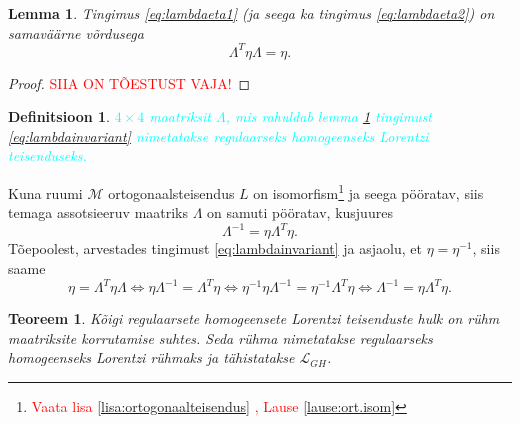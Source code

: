 \documentclass[a4paper,12pt]{article}
\newtheorem{teoreem}{Teoreem}[section]
\newtheorem{definitsioon}{Definitsioon}[section]
\newtheorem{lemma}{Lemma}[section]
\numberwithin{equation}{section}
\begin{document}
\begin{lemma} \label{lemma:lambdainvariant}
Tingimus \ref{eq:lambdaeta1} (ja seega ka tingimus \ref{eq:lambdaeta2}) on samaväärne võrdusega
\begin{equation} \label{eq:lambdainvariant}
\Lambda^T \eta \Lambda = \eta.
\end{equation}
\end{lemma}
\begin{proof}
\textcolor{red}
{SIIA ON TÕESTUST VAJA!}
\end{proof}
\begin{definitsioon}
\textcolor{cyan}{
$4 \times 4$ maatriksit $\Lambda$, mis rahuldab lemma \ref{lemma:lambdainvariant} tingimust \ref{eq:lambdainvariant} nimetatakse \emph{regulaarseks homogeenseks Lorentzi teisenduseks}.
}
\end{definitsioon}
Kuna ruumi $\mathcal{M}$ ortogonaalsteisendus $L$ on isomorfism\footnote{\textcolor{red}{Vaata lisa \ref{lisa:ortogonaalteisendus} , Lause \ref{lause:ort.isom}}} 
ja seega pööratav, siis temaga assotsieeruv maatriks $\Lambda$ on samuti pööratav, kusjuures
\begin{equation} \label{eq:lambda-1lambda-trans}
\Lambda^{-1} = \eta \Lambda^T \eta.
\end{equation}
Tõepoolest, arvestades tingimust \ref{eq:lambdainvariant} ja asjaolu, et $\eta = \eta^{-1}$, siis saame
\begin{equation*}
\eta = \Lambda^T \eta \Lambda \iff \eta \Lambda^{-1} = \Lambda^T \eta \iff \eta^{-1} \eta \Lambda^{-1} = \eta^{-1} \Lambda^T \eta \iff \Lambda^{-1} = \eta \Lambda^T \eta.
\end{equation*}

\begin{teoreem}
Kõigi regulaarsete homogeensete Lorentzi teisenduste hulk on rühm maatriksite korrutamise suhtes. Seda rühma nimetatakse \emph{regulaarseks homogeenseks Lorentzi rühmaks} ja tähistatakse $\mathcal{L}_{GH}$.
\end{teoreem}
\end{document}
